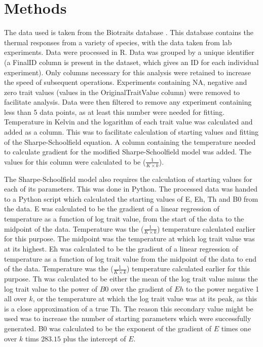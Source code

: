 \documentclass[11pt]{article}
\begin{document}
\section{Methods}
The data used is taken from the Biotraits database \citep{Dell2011}. This database contains the thermal responses from a variety of species, with the data taken from lab experiments.
Data were processed in R\citep{R2019}. Data was grouped by a unique identifier (a FinalID column is present in the dataset, which gives an ID for each individual experiment). Only columns necessary for this analysis were retained to increase the speed of subsequent operations. Experiments containing NA, negative and zero trait values (values in the OriginalTraitValue column) were removed to facilitate analysis. Data were then filtered to remove any experiment containing less than 5 data points, as at least this number were needed for fitting.  
Temperature in Kelvin and the logarithm of each trait value was calculated and added as a column. This was to facilitate calculation of starting values and fitting of the Sharpe-Schoolfield equation. 
A column containing the temperature needed to calculate gradient for the modified Sharpe-Schoolfield model was added. The values for this column were calculated to be ($\frac{ 1}{K \times k}$).

The Sharpe-Schoolfield model also requires the calculation of starting values for each of its parameters. This was done in Python\citep{Python32019}. The processed data was handed to a Python script which calculated the starting values of E, Eh, Th and B0 from the data. 
E was calculated to be the gradient of a linear regression of temperature as a function of log trait value, from the start of the data to the midpoint of the data. Temperature was the ($\frac{ 1}{K \times k}$) temperature calculated earlier for this purpose. The midpoint was the temperature at which log trait value was at its highest.
Eh was calculated to be the gradient of a linear regression of temperature as a function of log trait value from the midpoint of the data to end of the data. Temperature was the ($\frac{ 1}{K \times k}$) temperature calculated earlier for this purpose. 
Th was calculated to be either the mean of the log trait value minus the log trait value to the power of $B0$ over the gradient of $Eh$ to the power negative 1 all over $k$, 
or the temperature at which the log trait value was at its peak, as this is a close approximation of a true Th. The reason this secondary value might be used was to increase the number of starting parameters which were successfully generated. 
B0 was calculated to be the exponent of the gradient of $E$ times one over $k$ tims $283.15$ plus the intercept of $E$. 
\end{document}
